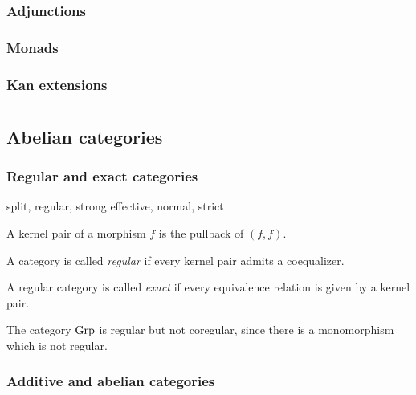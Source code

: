 \documentclass{../../large}
\begin{document}
\section{Adjunctions}

\section{Monads}

\section{Kan extensions}


\part{}


\chapter{}



\chapter{Abelian categories}
\section{Regular and exact categories}

split, regular, strong
effective, normal, strict

A kernel pair of a morphism $f$ is the pullback of $(f,f)$.

A category is called \emph{regular} if every kernel pair admits a coequalizer.

\begin{prb}
A regular category is called \emph{exact} if every equivalence relation is given by a kernel pair.
\begin{parts}
\item
\end{parts}
\end{prb}

The category $\mathrm{Grp}$ is regular but not coregular, since there is a monomorphism which is not regular.








\section{Additive and abelian categories}
\end{document}

